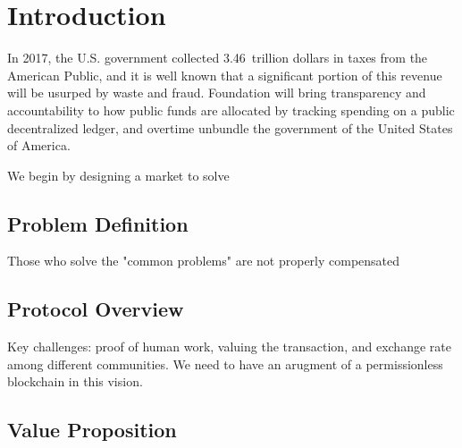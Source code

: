 \section{\textbf{Introduction}}


In 2017, the U.S. government collected 3.46 trillion dollars in taxes from the American Public, and it is well known that a significant portion of this revenue will be usurped by waste and fraud. Foundation will bring transparency and accountability to how public funds are allocated by tracking spending on a public decentralized ledger, and overtime unbundle the government of the United States of America.

We begin by designing a market to solve 








\subsection{Problem Definition}

Those who solve the "common problems" are not properly compensated

\subsection{Protocol Overview}

Key challenges: proof of human work, valuing the transaction, and exchange rate among different communities. We need to have an arugment of a permissionless blockchain in this vision. 

\subsection{Value Proposition}

